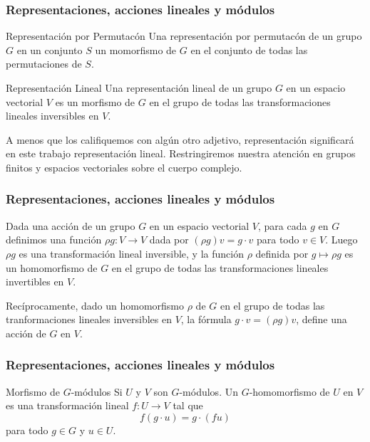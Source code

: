     \begin{frame}
        \frametitle{Representaciones, acciones lineales y m\'odulos}
        
        \begin{block}{Representaci\'on por Permutac\'on}
            Una representaci\'on por permutac\'on de un grupo $G$ en un conjunto $S$ un
            momorfismo de $G$ en el conjunto de todas las permutaciones de $S$.
        \end{block}
        
        \begin{block}{Representaci\'on Lineal }
            Una representaci\'on lineal de un grupo $G$ en un espacio vectorial $V$ es un
            morfismo de $G$ en el grupo de todas las transformaciones lineales inversibles en $V$.
        \end{block}
        
        A menos que los califiquemos con alg\'un otro adjetivo, representaci\'on significar\'a en este trabajo
        representaci\'on lineal. Restringiremos nuestra atenci\'on en grupos finitos y espacios vectoriales sobre
        el cuerpo complejo.
    \end{frame}
    

    \begin{frame}
	\frametitle{Representaciones, acciones lineales y m\'odulos}
	\begin{theorem}%
	    Dada una acci\'on de un grupo $G$ en un espacio vectorial $V$, para cada $g$ en $G$
	    definimos una funci\'on $\rho g : V \to V$ dada por $(\rho g)v = g \cdot v$ para todo $v \in V$.
	    Luego $\rho g$ es una transformaci\'on lineal inversible, y la funci\'on $\rho$ definida
	    por $g \mapsto \rho g$ es un homomorfismo de $G$ en el grupo de todas las transformaciones
	    lineales invertibles en $V$.
	    
	    Rec\'iprocamente, dado un homomorfismo $\rho$ de $G$ en el
	    grupo de todas las tranformaciones lineales inversibles en $V$, la f\'ormula
	    $g \cdot v = (\rho g)v$, define una acci\'on de $G$ en $V$.
	\end{theorem}
    \end{frame}

    \begin{frame}
	\frametitle{Representaciones, acciones lineales y m\'odulos}
    \begin{block}{Morfismo de $G$-m\'odulos}
    	Si $U$ y $V$ son $G$-m\'odulos. Un $G$-homomorfismo de $U$ en $V$ es una transformaci\'on
    	lineal $f : U \to V$ tal que $$ f(g \cdot u) = g \cdot (fu)$$  para todo $g \in G$ y $u \in U$.
    \end{block}
    \end{frame}